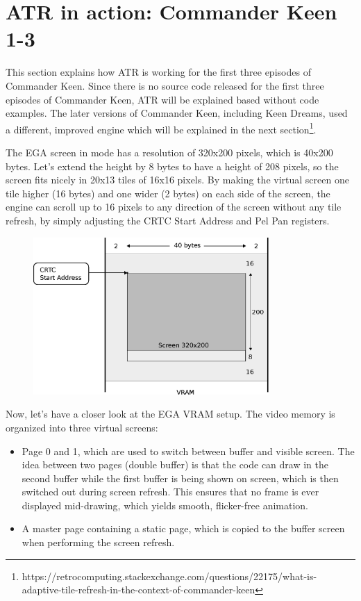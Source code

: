 \documentclass[book.tex]{subfiles}
\begin{document}
\section{ATR in action: Commander Keen 1-3}
This section explains how ATR is working for the first three episodes of Commander Keen. Since there is no source code released for the first three episodes of Commander Keen, ATR will be explained based without code examples. The later versions of Commander Keen, including Keen Dreams, used a different, improved engine which will be explained in the next section\footnote{https://retrocomputing.stackexchange.com/questions/22175/what-is-adaptive-tile-refresh-in-the-context-of-commander-keen}.\\

\par
The EGA screen in mode  has a resolution of 320x200 pixels, which is 40x200 bytes. Let's extend the height by 8 bytes to have a height of 208 pixels, so the screen fits nicely in 20x13 tiles of 16x16 pixels. By making the virtual screen one tile higher (16 bytes) and one wider (2 bytes) on each side of the screen, the engine can scroll up to 16 pixels to any direction of the screen without any tile refresh, by simply adjusting the CRTC Start Address and Pel Pan registers.\\

\begin{figure}[H]
\centering
\includegraphics[width=0.8\textwidth]{imgs/drawings/ATR_virtual_screen.eps}
\label{fig:atr_virtual screen}
\end{figure}

 
Now, let's have a closer look at the EGA VRAM setup. The video memory is organized into three virtual screens:
\begin{itemize}
\item Page 0 and 1, which are used to switch between buffer and visible screen. The idea between two pages (double buffer) is that the code can draw in the second buffer while the first buffer is being shown on screen, which is then switched out during screen refresh. This ensures that no frame is ever displayed mid-drawing, which yields smooth, flicker-free animation.
\item A master page containing a static page, which is copied to the buffer screen when performing the screen refresh.
\end{itemize}
\end{document}
